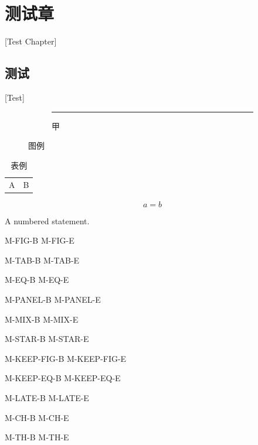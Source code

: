 \documentclass[\WiseOptions]{hithesis}
\begin{document}
\ifdefined\WiseFinal\mainmatter\chapter{测试章}[Test Chapter]\label{chapter}\fi
\section{测试}[Test]\label{topic}
\begin{figure}[htbp]
  \begin{subfigure}{.4\linewidth}\rule{10mm}{2mm}\caption{甲}\label{panel}\end{subfigure}
  \caption{图例}\label{picture}
\end{figure}
\begin{table}[htbp]\caption{表例}\label{result}\begin{tabular}{cc}A&B\end{tabular}\end{table}
\begin{equation}a=b\label{balance}\end{equation}
\ifdefined\WiseFinal
  \begin{theorem}\label{statement}A numbered statement.\end{theorem}
\fi
\clearpage
M-FIG-B  M-FIG-E\par
M-TAB-B  M-TAB-E\par
M-EQ-B  M-EQ-E\par
M-PANEL-B  M-PANEL-E\par
M-MIX-B  M-MIX-E\par
M-STAR-B  M-STAR-E\par
{
M-KEEP-FIG-B  M-KEEP-FIG-E\par
M-KEEP-EQ-B  M-KEEP-EQ-E\par
}
M-LATE-B  M-LATE-E\par
\ifdefined\WiseFinal
M-CH-B  M-CH-E\par
M-TH-B  M-TH-E\par
\fi
\end{document}
